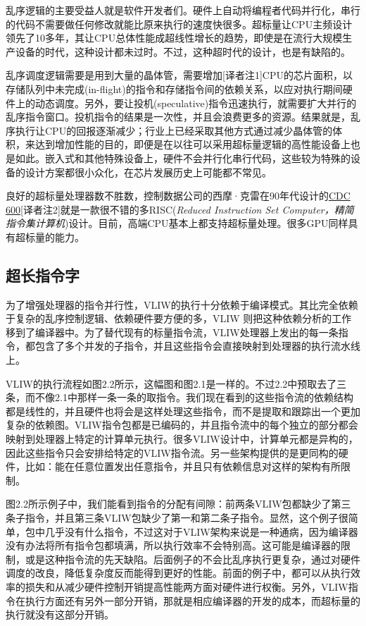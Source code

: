 乱序逻辑的主要受益人就是软件开发者们。硬件上自动将编程者代码并行化，串行的代码不需要做任何修改就能比原来执行的速度快很多。超标量让CPU主频设计领先了10多年，其让CPU总体性能成超线性增长的趋势，即使是在流行大规模生产设备的时代，这种设计都未过时。不过，这种超时代的设计，也是有缺陷的。

乱序调度逻辑需要是用到大量的晶体管，需要增加[译者注1]CPU的芯片面积，以存储队列中未完成(in-flight)的指令和存储指令间的依赖关系，以应对执行期间硬件上的动态调度。另外，要让投机(speculative)指令迅速执行，就需要扩大并行的乱序指令窗口。投机指令的结果是一次性，并且会浪费更多的资源。结果就是，乱序执行让CPU的回报逐渐减少；行业上已经采取其他方式通过减少晶体管的体积，来达到增加性能的目的，即便是在以往可以采用超标量逻辑的高性能设备上也是如此。嵌入式和其他特殊设备上，硬件不会并行化串行代码，这些较为特殊的设备的设计方案都很小众化，在芯片发展历史上可能都不常见。

良好的超标量处理器数不胜数，控制数据公司的西摩·克雷在90年代设计的\href{https://en.wikipedia.org/wiki/CDC\_6600}{CDC 600}[译者注2]就是一款很不错的多RISC(\emph{Reduced Instruction Set Computer，精简指令集计算机})设计。目前，高端CPU基本上都支持超标量处理。很多GPU同样具有超标量的能力。

\subsection{超长指令字}

为了增强处理器的指令并行性，VLIW的执行十分依赖于编译模式。其比完全依赖于复杂的乱序控制逻辑、依赖硬件要方便的多，VLIW 则把这种依赖分析的工作移到了编译器中。为了替代现有的标量指令流，VLIW处理器上发出的每一条指令，都包含了多个并发的子指令，并且这些指令会直接映射到处理器的执行流水线上。

VLIW的执行流程如图2.2所示，这幅图和图2.1是一样的。不过2.2中预取去了三条，而不像2.1中那样一条一条的取指令。我们现在看到的这些指令流的依赖结构都是线性的，并且硬件也将会是这样处理这些指令，而不是提取和跟踪出一个更加复杂的依赖图。VLIW指令包都是已编码的，并且指令流中的每个独立的部分都会映射到处理器上特定的计算单元执行。很多VLIW设计中，计算单元都是异构的，因此这些指令只会安排给特定的VLIW指令流。另一些架构提供的是更同构的硬件，比如：能在任意位置发出任意指令，并且只有依赖信息对这样的架构有所限制。


图2.2所示例子中，我们能看到指令的分配有间隙：前两条VLIW包都缺少了第三条子指令，并且第三条VLIW包缺少了第一和第二条子指令。显然，这个例子很简单，包中几乎没有什么指令，不过这对于VLIW架构来说是一种通病，因为编译器没有办法将所有指令包都填满，所以执行效率不会特别高。这可能是编译器的限制，或是这种指令流的先天缺陷。后面例子的不会比乱序执行更复杂，通过对硬件调度的改良，降低复杂度反而能得到更好的性能。前面的例子中，都可以从执行效率的损失和从减少硬件控制开销提高性能两方面对硬件进行权衡。另外，VLIW指令在执行方面还有另外一部分开销，那就是相应编译器的开发的成本，而超标量的执行就没有这部分开销。

